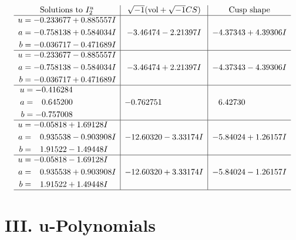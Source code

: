 \documentclass[1p]{elsarticle_modified}
\theoremstyle{definition}
\newcommand{\I}{\sqrt{-1}}
\begin{document}
$$\begin{array}{c|c|c}  
\text{Solutions to }I^u_{2}& \I (\text{vol} + \sqrt{-1}CS) & \text{Cusp shape}\\
 \hline 
\begin{aligned}
u &= -0.233677 + 0.885557 I \\
a &= -0.758138 + 0.584034 I \\
b &= -0.036717 - 0.471689 I\end{aligned}
 & -3.46474 - 2.21397 I & -4.37343 + 4.39306 I \\ \hline\begin{aligned}
u &= -0.233677 - 0.885557 I \\
a &= -0.758138 - 0.584034 I \\
b &= -0.036717 + 0.471689 I\end{aligned}
 & -3.46474 + 2.21397 I & -4.37343 - 4.39306 I \\ \hline\begin{aligned}
u &= -0.416284\phantom{ +0.000000I} \\
a &= \phantom{-}0.645200\phantom{ +0.000000I} \\
b &= -0.757008\phantom{ +0.000000I}\end{aligned}
 & -0.762751\phantom{ +0.000000I} & \phantom{-}6.42730\phantom{ +0.000000I} \\ \hline\begin{aligned}
u &= -0.05818 + 1.69128 I \\
a &= \phantom{-}0.935538 - 0.903908 I \\
b &= \phantom{-}1.91522 - 1.49448 I\end{aligned}
 & -12.60320 - 3.33174 I & -5.84024 + 1.26157 I \\ \hline\begin{aligned}
u &= -0.05818 - 1.69128 I \\
a &= \phantom{-}0.935538 + 0.903908 I \\
b &= \phantom{-}1.91522 + 1.49448 I\end{aligned}
 & -12.60320 + 3.33174 I & -5.84024 - 1.26157 I\\
 \hline 
 \end{array}$$\newpage
\newpage\renewcommand{\arraystretch}{1}
\centering \section*{ III. u-Polynomials}
\end{document}
